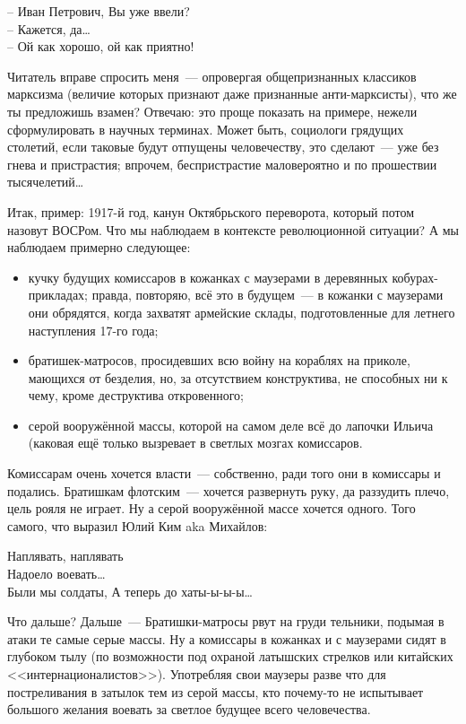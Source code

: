 \begin{shadequote}{}
-- Иван Петрович, Вы уже ввели? \\
-- Кажется, да\dots \\
-- Ой как хорошо, ой как приятно!
\end{shadequote}

Читатель вправе спросить меня~--- опровергая общепризнанных классиков марксизма (величие которых признают даже признанные анти-марксисты), что же ты предложишь взамен? Отвечаю: это проще показать на примере, нежели сформулировать в научных терминах. Может быть, социологи грядущих столетий, если таковые будут отпущены человечеству, это сделают~--- уже без гнева и пристрастия; впрочем, беспристрастие маловероятно и по прошествии тысячелетий\dots

Итак, пример: 1917-й год, канун Октябрьского переворота, который потом назовут ВОСРом. Что мы наблюдаем в контексте революционной ситуации? А мы наблюдаем примерно следующее:

\begin{itemize}
	\item кучку будущих комиссаров в кожанках с маузерами в деревянных кобурах-прикладах; правда, повторяю, всё это в будущем~--- в кожанки с маузерами они обрядятся, когда захватят армейские склады, подготовленные для летнего наступления 17-го года; 
	\item братишек-матросов, просидевших всю войну на кораблях на приколе, мающихся от безделия, но, за отсутствием конструктива, не способных ни к чему, кроме деструктива откровенного; 
	\item серой вооружённой массы, которой на самом деле всё до лапочки Ильича (каковая ещё только вызревает в светлых мозгах комиссаров. 
\end{itemize}



Комиссарам очень хочется власти~--- собственно, ради того они в комиссары и подались. Братишкам флотским~--- хочется развернуть руку, да раззудить плечо, цель рояля не играет. Ну а серой вооружённой массе хочется одного. Того самого, что выразил Юлий Ким aka Михайлов:

\begin{shadequote}{}
Наплявать, наплявать\\ 
Надоело воевать\dots \\
Были мы солдаты, А теперь до хаты-ы-ы-ы\dots
\end{shadequote}

Что дальше? Дальше~--- Братишки-матросы рвут на груди тельники, подымая в атаки те самые серые массы. Ну а комиссары в кожанках и с маузерами сидят в глубоком тылу (по возможности под охраной латышских стрелков или китайских <<интернационалистов>>). Употребляя свои маузеры разве что для постреливания в затылок тем из серой массы, кто почему-то не испытывает большого желания воевать за светлое будущее всего человечества.


